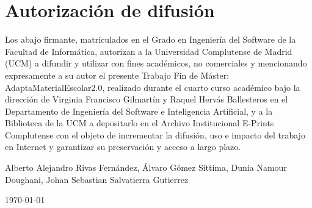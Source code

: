 \chapter*{Autorización de difusión}

   
Los abajo firmante, matriculados en el Grado en Ingeniería del Software de la Facultad de Informática, autorizan a la Universidad Complutense de Madrid (UCM) a difundir y utilizar con fines académicos, no comerciales y mencionando expresamente a su autor el presente Trabajo Fin de Máster: AdaptaMaterialEscolar2.0, realizado durante el cuarto curso académico bajo la dirección de Virginia Francisco Gilmartín y Raquel Hervás Ballesteros en el Departamento de Ingeniería del Software e Inteligencia Artificial, y a la Biblioteca de la UCM a depositarlo en el Archivo Institucional E-Prints Complutense con el objeto de incrementar la difusión, uso e impacto del trabajo en Internet y garantizar su preservación y acceso a largo plazo.

\vspace{5cm}

\begin{center}
	\large Alberto Alejandro Rivas Fernández, Álvaro Gómez Sittima, Dunia Namour Doughani, Johan Sebastian Salvatierra Gutierrez
	
	\vspace{0.5cm}
	
	
	\today\\
	
\end{center}
